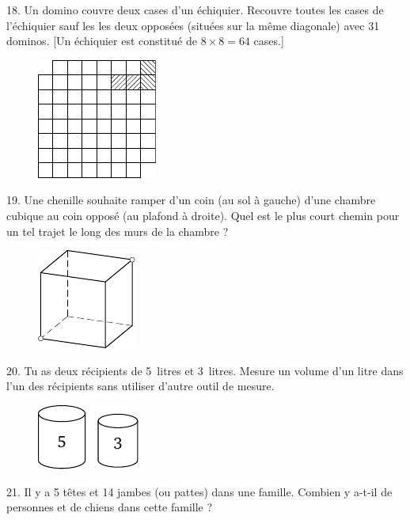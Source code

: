 \begin{problem}{18.}
	Un domino couvre deux cases d'un échiquier.
	Recouvre toutes les cases de l'échiquier sauf les les deux opposées 
	(situées sur la même diagonale) avec 31 dominos.
	[Un échiquier est constitué de $8 \times 8 = 64$ cases.]
	\begin{figure}
		\includegraphics{resources/taskbook-2}
	\end{figure}
\end{problem}

\begin{problem}{19.}
	Une chenille souhaite ramper d'un coin (au sol à gauche) d'une chambre 
	cubique au coin opposé (au plafond à droite).
	Quel est le plus court chemin pour un tel trajet le long des murs de 
	la chambre ?
	\begin{figure}
		\includegraphics{resources/taskbook-3}
	\end{figure}
\end{problem}

\begin{problem}{20.}
	Tu as deux récipients de 5~litres et 3~litres. 
	Mesure un volume d'un litre dans l'un des récipients sans utiliser d'autre 
	outil de mesure.
	\begin{figure}
		\includegraphics{resources/taskbook-4}
	\end{figure}
\end{problem}

\begin{problem}{21.}
	Il y a 5 têtes et 14 jambes (ou pattes) dans une famille.
	Combien y a-t-il de personnes et de chiens dans cette famille ?
\end{problem}

